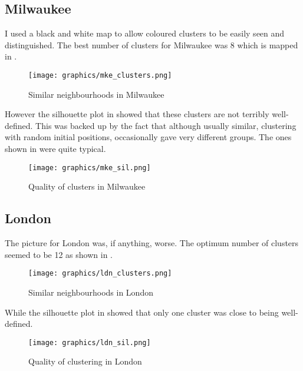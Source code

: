 \documentclass[a4paper,12pt,final,UKenglish]{article}
\begin{document}
        \subsection{Milwaukee}
            I used a black and white map to allow coloured clusters to be easily seen and distinguished.
            The best number of clusters for Milwaukee was 8 which is mapped in .
\begin{figure}[htb]
 \centering
 \texttt{[image: graphics/mke\_clusters.png]}
 \caption{Similar neighbourhoods in Milwaukee}
 \label{fig:MKEclusters}
\end{figure}
            However the silhouette plot in  showed that these clusters are not terribly well-defined.  This was backed up by the fact that
            although usually similar, clustering with random initial positions, occasionally gave very different groups.  The ones shown in 
            were quite typical.
\begin{figure}[htb]
 \centering
 \texttt{[image: graphics/mke\_sil.png]}
 \caption{Quality of clusters in Milwaukee}
 \label{fig:MKEsil}
\end{figure}
        \subsection{London}
            The picture for London was, if anything, worse.  The optimum number of clusters seemed to be 12 as shown in .
\begin{figure}[htb]
 \centering
 \texttt{[image: graphics/ldn\_clusters.png]}
 \caption{Similar neighbourhoods in London}
 \label{fig:LDNclusters}
\end{figure}
            While the silhouette plot in  showed that only one cluster was close to being well-defined.
\begin{figure}[htb]
 \centering
 \texttt{[image: graphics/ldn\_sil.png]}
 \caption{Quality of clustering in London}
 \label{fig:LDNsil}
\end{figure}
\end{document}
